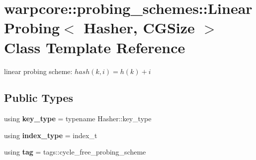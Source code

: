 \hypertarget{classwarpcore_1_1probing__schemes_1_1LinearProbing}{}\section{warpcore\+:\+:probing\+\_\+schemes\+:\+:Linear\+Probing$<$ Hasher, C\+G\+Size $>$ Class Template Reference}
\label{classwarpcore_1_1probing__schemes_1_1LinearProbing}


linear probing scheme\+: $hash(k,i) = h(k)+i$  


\subsection*{Public Types}
\begin{DoxyCompactItemize}
\item 
\mbox{\label{classwarpcore_1_1probing__schemes_1_1LinearProbing_a1397e29f9b9d241e1c9deb6ff412b447}} 
using {\bfseries key\+\_\+type} = typename Hasher\+::key\+\_\+type
\item 
\mbox{\label{classwarpcore_1_1probing__schemes_1_1LinearProbing_a5e13def23b2072873b9233f630b74db8}} 
using {\bfseries index\+\_\+type} = index\+\_\+t
\item 
\mbox{\label{classwarpcore_1_1probing__schemes_1_1LinearProbing_afb6146a3a2e0d49a59465f3cdf444fc0}} 
using {\bfseries tag} = tags\+::cycle\+\_\+free\+\_\+probing\+\_\+scheme
\end{DoxyCompactItemize}

